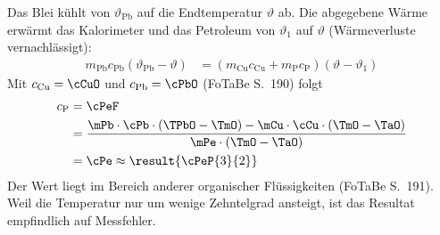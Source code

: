 Das Blei kühlt von $\vartheta_\text{Pb}$ auf die Endtemperatur $\vartheta$ ab. Die abgegebene Wärme erwärmt das Kalorimeter und das Petroleum von $\vartheta_1$ auf $\vartheta$ (Wärmeverluste vernachlässigt):
\begin{align}
 m_\text{Pb}c_\text{Pb}\left(\vartheta_\text{Pb}-\vartheta\right) &= \left(m_\text{Cu}c_\text{Cu}+m_\text{P}c_\text{P}\right)\left(\vartheta-\vartheta_1\right)
\end{align}
Mit $c_\text{Cu} = \cCuO$ und $c_\text{Pb} = \cPbO$ (FoTaBe S.~190) folgt
\begin{align}
 c_\text{P} &= \cPeF \\
   &= \frac{\mPb\cdot\cPb\cdot\left(\TPbO-\TmO\right)-\mCu\cdot\cCu\cdot\left(\TmO-\TaO\right)}{\mPe\cdot\left(\TmO-\TaO\right)} \\
   &= \cPe \approx \result{\cPeP{3}{2}}
\end{align}
Der Wert liegt im Bereich anderer organischer Flüssigkeiten (FoTaBe S.~191). Weil die Temperatur nur um wenige Zehntelgrad ansteigt, ist das Resultat empfindlich auf Messfehler.
